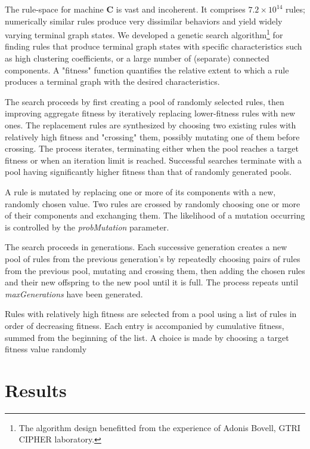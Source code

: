 \documentclass{tufte-handout}
\begin{document}
The rule-space for machine \textbf{C} is vast and incoherent. It comprises
$7.2 \times 10^{14}$ rules; numerically similar rules produce
very dissimilar behaviors and yield widely varying terminal graph states.
We developed a genetic search algorithm\footnote{The algorithm design benefitted
from the experience of Adonis Bovell, GTRI CIPHER laboratory.}
for finding rules that produce terminal
graph states with specific characteristics such as high clustering coefficients, or
a large number of (separate) connected components. A "fitness" function
quantifies the relative extent to which a rule produces a terminal graph
with the desired characteristics.

The search proceeds by first creating a pool of randomly selected rules, then
improving aggregate fitness by iteratively replacing lower-fitness rules
with new ones. The replacement rules are synthesized by
choosing two existing rules with relatively high fitness and "crossing" them,
possibly mutating one of them before crossing. The process iterates, terminating
either when the pool reaches a target fitness or when an iteration limit
is reached. Successful searches terminate with a pool having significantly
higher fitness than that of randomly generated pools.

A rule is mutated by replacing one or more of its components with a new,
randomly chosen value. Two rules are crossed by randomly choosing one or
more of their components and exchanging them. The likelihood of a mutation
occurring is controlled by the \textit{probMutation} parameter.

The search proceeds in generations. Each successive generation creates a new
pool of rules from the previous generation's by repeatedly choosing pairs
of rules from the previous pool, mutating and crossing them, then adding
the chosen rules and their new offspring to the new pool until
it is full. The process repeats until \textit{maxGenerations} have been
generated.

Rules with relatively high fitness are selected from a pool using
a list of rules in order of decreasing fitness. Each entry
is accompanied by cumulative fitness, summed from the beginning
of the list. A choice is made by choosing a target fitness value
randomly


\section{Results}
\end{document}
